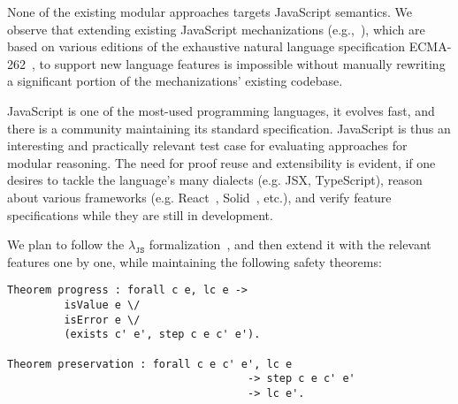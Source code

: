 \documentclass[sigplan,nonacm,review]{acmart}
\begin{document}

None of the existing modular approaches targets JavaScript semantics.
We observe that extending existing JavaScript mechanizations (e.g.,~\cite{guha2010essence,bodin2014trusted}), which are based on various editions of the exhaustive natural language specification ECMA-262~\cite{ECMA},
to support new language features
is impossible without manually rewriting a significant portion of the mechanizations' existing codebase.


JavaScript is one of the most-used programming languages, it evolves fast, and there is a community maintaining its standard specification. 
JavaScript is thus an interesting and practically relevant test case for evaluating approaches for modular reasoning. The need for proof reuse and extensibility is evident, if one desires to tackle the language's many dialects (e.g. JSX, TypeScript), reason about various frameworks (e.g. React~\cite{React}, Solid~\cite{Solid}, etc.), and verify feature specifications while they are still in development. 



We plan to follow the $\lambda_{\texttt{JS}}$ formalization~\cite{guha2010essence},
and then extend it with the relevant features one by one,
while maintaining the following safety theorems:

\begin{lstlisting}[numbers=none, language=Coq]
Theorem progress : forall c e, lc e -> 
         isValue e \/ 
         isError e \/ 
         (exists c' e', step c e c' e').

Theorem preservation : forall c e c' e', lc e
                                      -> step c e c' e'
                                      -> lc e'.
\end{lstlisting}
\end{document}
